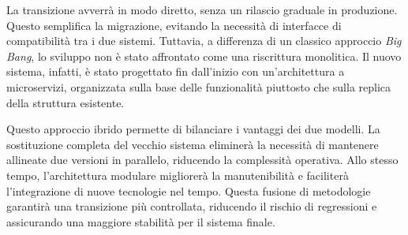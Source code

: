 La transizione avverrà in modo diretto, senza un rilascio graduale in produzione. Questo semplifica la migrazione, evitando la necessità di interfacce di compatibilità tra i due sistemi. Tuttavia, a differenza di un classico approccio \textit{Big Bang}, lo sviluppo non è stato affrontato come una riscrittura monolitica. Il nuovo sistema, infatti, è stato progettato fin dall'inizio con un'architettura a microservizi, organizzata sulla base delle funzionalità piuttosto che sulla replica della struttura esistente.

Questo approccio ibrido permette di bilanciare i vantaggi dei due modelli. La sostituzione completa del vecchio sistema eliminerà la necessità di mantenere allineate due versioni in parallelo, riducendo la complessità operativa. Allo stesso tempo, l'architettura modulare migliorerà la manutenibilità e faciliterà l'integrazione di nuove tecnologie nel tempo. Questa fusione di metodologie garantirà una transizione più controllata, riducendo il rischio di regressioni e assicurando una maggiore stabilità per il sistema finale.
